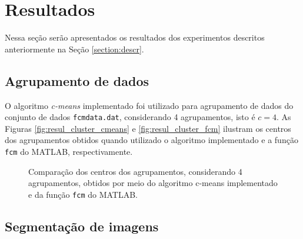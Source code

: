 \documentclass[12pt,a4paper]{article}
\numberwithin{equation}{section}
\begin{document}
{%
\section{Resultados}

Nessa seção serão apresentados os resultados dos experimentos descritos anteriormente na Seção \ref{section:descr}.

\subsection{Agrupamento de dados}

O algoritmo \textit{c-means} implementado foi utilizado para agrupamento de dados do conjunto de dados \texttt{fcmdata.dat}, considerando 4 agrupamentos, isto é $c=4$. As Figuras \ref{fig:resul_cluster_cmeans} e \ref{fig:resul_cluster_fcm} ilustram os centros dos agrupamentos obtidos quando utilizado o algoritmo implementado e a função \texttt{fcm} do MATLAB, respectivamente.

\begin{figure}[!htbp]
	\centering
	
	\caption{Comparação dos centros dos agrupamentos, considerando 4 agrupamentos, obtidos por meio do algoritmo c-means implementado e da função \texttt{fcm} do MATLAB.}
\end{figure}

\subsection{Segmentação de imagens}
\label{subsection:seg}

}
\end{document}
